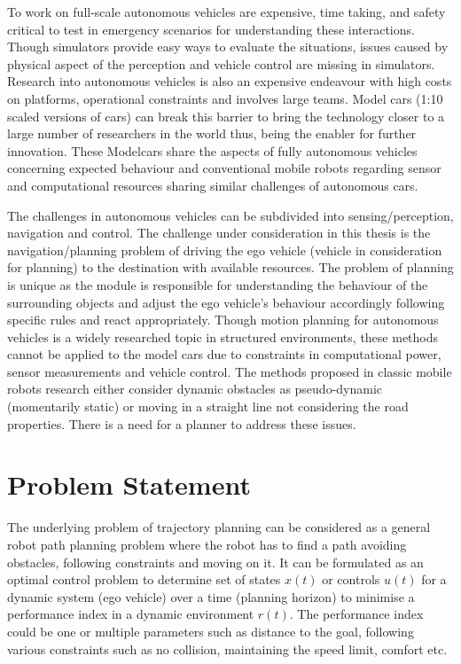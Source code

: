 To work on full-scale autonomous vehicles are expensive, time taking, and safety critical to test in emergency scenarios for understanding these interactions. Though simulators provide easy ways to evaluate the situations, issues caused by physical aspect of the perception and vehicle control are missing in simulators. Research into autonomous vehicles is also an expensive endeavour with high costs on platforms, operational constraints and involves large teams. Model cars (1:10 scaled versions of cars) can break this barrier to bring the technology closer to a large number of researchers in the world thus, being the enabler for further innovation. These Modelcars share the aspects of fully autonomous vehicles concerning expected behaviour and conventional mobile robots regarding sensor and computational resources sharing similar challenges of autonomous cars. 

The challenges in autonomous vehicles can be subdivided into sensing/perception, navigation and control. The challenge under consideration in this thesis is the navigation/planning problem of driving the ego vehicle (vehicle in consideration for planning) to the destination with available resources. The problem of planning is unique as the module is responsible for understanding the behaviour of the surrounding objects and adjust the ego vehicle's behaviour accordingly following specific rules and react appropriately. Though motion planning for autonomous vehicles is a widely researched topic in structured environments, these methods cannot be applied to the model cars due to constraints in computational power, sensor measurements and vehicle control. The methods proposed in classic mobile robots research either consider dynamic obstacles as pseudo-dynamic (momentarily static) or moving in a straight line not considering the road properties. There is a need for a planner to address these issues. 

\section{Problem Statement}

The underlying problem of trajectory planning can be considered as a general robot path planning problem where the robot has to find a path avoiding obstacles, following constraints and moving on it. It can be formulated as an optimal control problem to determine set of states $x(t)$ or controls $u(t)$ for a dynamic system (ego vehicle) over a time (planning horizon) to minimise a performance index in a dynamic environment $r(t)$. The performance index could be one or multiple parameters such as distance to the goal, following various constraints such as no collision, maintaining the speed limit, comfort etc.


